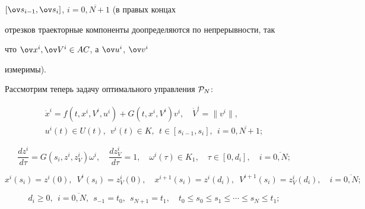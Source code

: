 $[\ov s_{i-1},\ov s_i]$, $i=\overline{0,N+1}$ (в правых концах


отрезков траекторные компоненты доопределяются по непрерывности, так


что $\ov x^i,\ov V^i\in AC$, а $\ov u^i$, $\ov v^i$


измеримы).





Рассмотрим теперь задачу оптимального управления ${\cal P}_N$:


\begin{equation}


\begin{array}{c}


\Dot{x}^i=f(t,x^i ,V^i,u^i)+G(t,x^i,V^i)v^i,


\quad \Dot V^i=\|v^i\|,\\[3mm]


u^i(t)\in U(t),\ \ v^i(t)\in K, \ \


t\in [s_{i-1},s_i], \ \ i=\overline{0,N+1};


\end{array}


\label{ggl5}


\end{equation}


%


\begin{equation}


\dfrac{dz^i}{d\tau}=G(s_i,z^i,z_V^i)\omega^i,\quad


\dfrac{dz_V^i}{d\tau}=1, \quad


\omega^i(\tau)\in K_1,\quad


\tau\in [0,d_i],\quad i=\overline{0,N};


\label{ggl6}


\end{equation}


%


\begin{equation}


x^i(s_i)=z^i(0), \ \; V^i(s_i)=z_V^i(0),\quad


x^{i+1}(s_i)=z^i(d_i), \ \; V^{i+1}(s_i)=z_V^i(d_i),\quad


i=\overline{0,N}; \label{ggl7} \end{equation}


%


\begin{equation}


d_i\geq 0,\ \ i=\overline{0,N},\ \


s_{-1}=t_0, \ \ s_{N+1}=t_1, \quad


t_0\leq {s}_0\leq {s}_1\le\dotsb\leq {s}_N\leq t_1;


\label{ggl8}


\end{equation}


